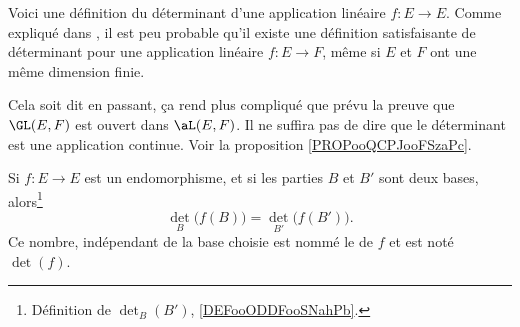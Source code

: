 \begin{normaltext}
	Voici une définition du déterminant d'une application linéaire \(f \colon E\to E  \). Comme expliqué dans \cite{BIBooJLVVooEdGshG}, il est peu probable qu'il existe une définition satisfaisante de déterminant pour une application linéaire \(f \colon E\to F  \), même si \( E\) et \( F\) ont une même dimension finie.

	Cela soit dit en passant, ça rend plus compliqué que prévu la preuve que \( \GL(E,F)\) est ouvert dans \( \aL(E,F)\). Il ne suffira pas de dire que le déterminant est une application continue. Voir la proposition \ref{PROPooQCPJooFSzaPc}.
\end{normaltext}

\begin{lemmaDef}       \label{LEMooQTRVooAKzucd}
	Si \( f\colon E\to E\) est un endomorphisme, et si les parties \( B\) et \( B'\) sont deux bases, alors\footnote{Définition de \( \det_B(B')\), \ref{DEFooODDFooSNahPb}.}
	\begin{equation}
		\det_B\big( f(B) \big)=\det_{B'}\big( f(B') \big).
	\end{equation}
	Ce nombre, indépendant de la base choisie est nommé le  de \( f\) et est noté \( \det(f)\).
\end{lemmaDef}

